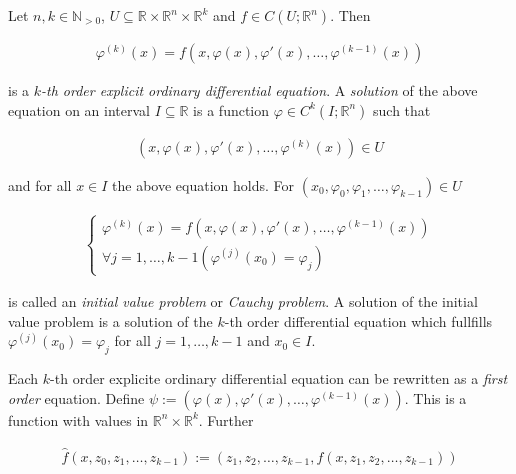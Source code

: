 \begin{mdframed}
	\begin{definition}
		Let $n,k \in \mathbb{N}_{>0}$, $U \subseteq \mathbb{R} \times \mathbb{R}^{n} \times \mathbb{R}^k$ and $f \in C(U; \mathbb{R}^n)$. Then

		\begin{gather}
			\varphi^{(k)}(x) = f\left( x, \varphi(x), \varphi'(x), \hdots, \varphi^{(k-1)}(x) \right)
		\end{gather}

		is a \emph{$k$-th order explicit ordinary differential equation}. A \emph{solution} of the above equation on an interval $I \subseteq \mathbb{R}$ is a function $\varphi \in C^k(I;\mathbb{R}^n)$ such that 
		
		\begin{gather}
			\left( x, \varphi(x), \varphi'(x), \hdots,\varphi^{(k)}(x) \right) \in U			
		\end{gather}
		
		and for all $x \in I$ the above equation holds. For $(x_0, \varphi_0, \varphi_1,\hdots,\varphi_{k-1}) \in U$ 

		\begin{gather}
			\begin{cases}
				\varphi^{(k)}(x) = f\left( x, \varphi(x), \varphi'(x), \hdots, \varphi^{(k-1)}(x) \right)\\
				\forall j = 1,\hdots,k - 1\left(\varphi^{(j)}(x_0) = \varphi_j\right)
			\end{cases}
		\end{gather}

		is called an \emph{initial value problem} or \emph{Cauchy problem}. A solution of the initial value problem is a solution of the $k$-th order differential equation which fullfills $\varphi^{(j)}(x_0) = \varphi_j$ for all $j = 1,\hdots,k-1$ and $x_0 \in I$.
	\end{definition}
\end{mdframed}

Each $k$-th order explicite ordinary differential equation can be rewritten as a \emph{first order} equation. Define $\psi:= \left( \varphi(x), \varphi'(x), \hdots,\varphi^{(k-1)}(x) \right)$. This is a function with values in $\mathbb{R}^n \times \mathbb{R}^k$. Further

\begin{gather}
	\hat{f}(x, z_0, z_1,\hdots,z_{k-1}) := \left( z_1,z_2,\hdots,z_{k-1},f(x, z_1,z_2,\hdots,z_{k-1}) \right)
\end{gather}

